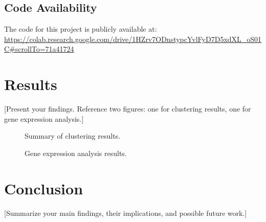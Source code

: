 \documentclass[12pt,letterpaper]{article}
\begin{document}
\subsection{Code Availability}
The code for this project is publicly available at: \\
\url{https://colab.research.google.com/drive/1HZrv7ODnstypcYvlFyD7D5xdXL_oS01C#scrollTo=71a41724}

\section{Results}
[Present your findings. Reference two figures: one for clustering results, one for gene expression analysis.]

\begin{figure}[h!]
	\centering
	\caption{Summary of clustering results.}
	\label{fig:clustering}
\end{figure}

\begin{figure}[h!]
	\centering
	\caption{Gene expression analysis results.}
	\label{fig:gene_expression}
\end{figure}

\section{Conclusion}
[Summarize your main findings, their implications, and possible future work.]
\end{document}
